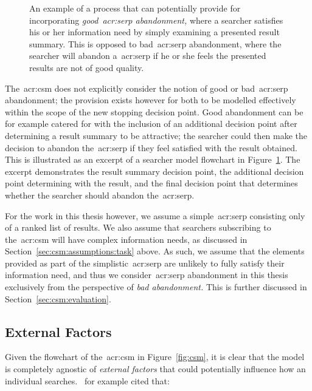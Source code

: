 \begin{figure}[t!]
    \centering
    \caption[Good abandonment flowchart]{An example of a process that can potentially provide for incorporating \emph{good~\gls{acr:serp} abandonment,} where a searcher satisfies his or her information need by simply examining a presented result summary. This is opposed to bad~\gls{acr:serp} abandonment, where the searcher will abandon a~\gls{acr:serp} if he or she feels the presented results are not of good quality.}
    \label{fig:good}
\end{figure}

The~\gls{acr:csm} does not explicitly consider the notion of good or bad~\gls{acr:serp} abandonment; the provision exists however for both to be modelled effectively within the scope of the new stopping decision point. Good abandonment can be for example catered for with the inclusion of an additional decision point after determining a result summary to be attractive; the searcher could then make the decision to abandon the~\gls{acr:serp} if they feel satisfied with the result obtained. This is illustrated as an excerpt of a searcher model flowchart in Figure~\ref{fig:good}. The excerpt demonstrates the result summary  decision point, the additional decision point determining  with the result, and the final decision point that determines whether the searcher should abandon the~\gls{acr:serp}.

For the work in this thesis however, we assume a simple~\gls{acr:serp} consisting only of a ranked list of results. We also assume that searchers subscribing to the~\gls{acr:csm} will have complex information needs, as discussed in Section~\ref{sec:csm:assumptions:task} above. As such, we assume that the elements provided as part of the simplistic~\gls{acr:serp} are unlikely to fully satisfy their information need, and thus we consider~\gls{acr:serp} abandonment in this thesis exclusively from the perspective of \emph{bad abandonment.} This is further discussed in Section~\ref{sec:csm:evaluation}.

\subsection{External Factors}
Given the flowchart of the~\gls{acr:csm} in Figure~\ref{fig:csm}, it is clear that the model is completely agnostic of \emph{external factors} that could potentially influence how an individual searches.~\cite{kelly2009iir} for example cited that:

